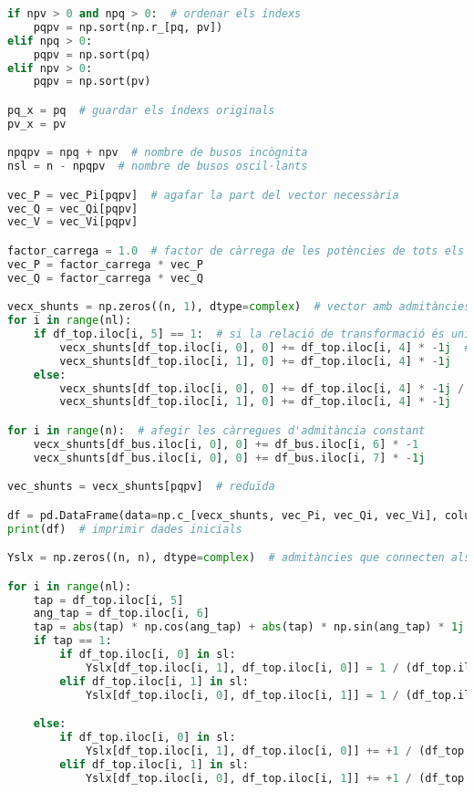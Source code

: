 \begin{lstlisting}[language=Python,numbers=none]
if npv > 0 and npq > 0:  # ordenar els índexs
    pqpv = np.sort(np.r_[pq, pv])
elif npq > 0:
    pqpv = np.sort(pq)
elif npv > 0:
    pqpv = np.sort(pv)

pq_x = pq  # guardar els índexs originals
pv_x = pv

npqpv = npq + npv  # nombre de busos incògnita
nsl = n - npqpv  # nombre de busos oscil·lants

vec_P = vec_Pi[pqpv]  # agafar la part del vector necessària
vec_Q = vec_Qi[pqpv]
vec_V = vec_Vi[pqpv]

factor_carrega = 1.0  # factor de càrrega de les potències de tots els busos
vec_P = factor_carrega * vec_P
vec_Q = factor_carrega * vec_Q

vecx_shunts = np.zeros((n, 1), dtype=complex)  # vector amb admitàncies shunt, canviat de signe
for i in range(nl):
    if df_top.iloc[i, 5] == 1:  # si la relació de transformació és unitària
        vecx_shunts[df_top.iloc[i, 0], 0] += df_top.iloc[i, 4] * -1j  # es donen en forma d'admitàncies
        vecx_shunts[df_top.iloc[i, 1], 0] += df_top.iloc[i, 4] * -1j
    else:
        vecx_shunts[df_top.iloc[i, 0], 0] += df_top.iloc[i, 4] * -1j / (df_top.iloc[i, 5] ** 2)
        vecx_shunts[df_top.iloc[i, 1], 0] += df_top.iloc[i, 4] * -1j

for i in range(n):  # afegir les càrregues d'admitància constant
    vecx_shunts[df_bus.iloc[i, 0], 0] += df_bus.iloc[i, 6] * -1
    vecx_shunts[df_bus.iloc[i, 0], 0] += df_bus.iloc[i, 7] * -1j

vec_shunts = vecx_shunts[pqpv]  # reduïda

df = pd.DataFrame(data=np.c_[vecx_shunts, vec_Pi, vec_Qi, vec_Vi], columns=['Ysh', 'P0', 'Q0', 'V0'])
print(df)  # imprimir dades inicials

Yslx = np.zeros((n, n), dtype=complex)  # admitàncies que connecten als oscil·lants

for i in range(nl):
    tap = df_top.iloc[i, 5]
    ang_tap = df_top.iloc[i, 6]
    tap = abs(tap) * np.cos(ang_tap) + abs(tap) * np.sin(ang_tap) * 1j
    if tap == 1:
        if df_top.iloc[i, 0] in sl:
            Yslx[df_top.iloc[i, 1], df_top.iloc[i, 0]] = 1 / (df_top.iloc[i, 2] + df_top.iloc[i, 3] * 1j) + Yslx[df_top.iloc[i, 1], df_top.iloc[i, 0]]
        elif df_top.iloc[i, 1] in sl:
            Yslx[df_top.iloc[i, 0], df_top.iloc[i, 1]] = 1 / (df_top.iloc[i, 2] + df_top.iloc[i, 3] * 1j) + Yslx[df_top.iloc[i, 0], df_top.iloc[i, 1]]

    else:
        if df_top.iloc[i, 0] in sl:
            Yslx[df_top.iloc[i, 1], df_top.iloc[i, 0]] += +1 / (df_top.iloc[i, 2] + df_top.iloc[i, 3] * 1j) / (np.conj(tap))
        elif df_top.iloc[i, 1] in sl:
            Yslx[df_top.iloc[i, 0], df_top.iloc[i, 1]] += +1 / (df_top.iloc[i, 2] + df_top.iloc[i, 3] * 1j) / tap


\end{lstlisting}

